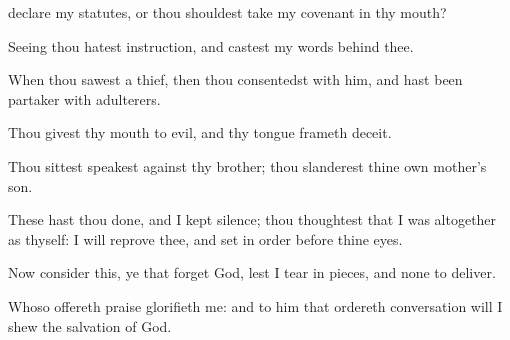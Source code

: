 {declare my
statutes, or
{} thou shouldest
take my
covenant in thy
mouth?
\par }{\Q {}Seeing thou
hatest
instruction, and
castest my
words
behind thee.
\par }{\Q {}When thou
sawest a
thief, then thou
consentedst with him, and hast been
partaker with
adulterers.
\par }{\Q {}Thou
givest thy
mouth to
evil, and thy
tongue
frameth
deceit.
\par }{\Q {}Thou
sittest
{}
speakest against thy
brother;
thou
slanderest thine own
mother’s
son.
\par }{\Q {}These
{} hast thou
done, and I kept
silence; thou
thoughtest that I was
altogether
{} as thyself:
{} I will
reprove thee, and set
{} in
order before thine
eyes.
\par }{\Q {}Now
consider this, ye that
forget
God, lest I tear
{} in
pieces, and
{} none to
deliver.
\par }{\Q {}Whoso
offereth
praise
glorifieth me: and to him that
ordereth
{}
conversation
{} will I
shew the
salvation of
God.

}
